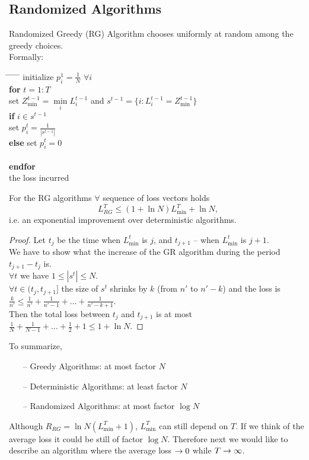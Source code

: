 \subsection{Randomized Algorithms}
\begin{definition}
Randomized Greedy (RG) Algorithm chooses uniformly at random among the greedy choices.\\
Formally:
\begin{tabbing}
\hspace*{.25in} \= \hspace*{.25in} \= \hspace*{.25in} \= \hspace*{.25in} \= \hspace*{.25in} \=\kill
\> initialize $p^1_i=\frac{1}{N}$ $\forall i$\\
\> {\bf for} $t=1:T$\\
\>\> set $Z^{t-1}_{\min}=\min\limits_{i}L^{t-1}_i$ and $s^{t-1}=\{i:L^{t-1}_i=Z^{t-1}_{\min}\}$\\
\>\> {\bf if} $i\in s^{t-1}$\\
\>\>\> set $p^t_i=\frac{1}{|s^{t-1}|}$\\
\>\> {\bf else} set $p^t_i=0$\\
\> \\
\> {\bf endfor}\\
 the loss incurred
\end{tabbing}
\end{definition}
\begin{theorem}
For the RG algorithms $\forall$ sequence of loss vectors holds
$$
L^T_{RG}\leq(1+\ln N)L^T_{\min}+\ln N,
$$
i.e. an exponential improvement over deterministic algorithms.
\end{theorem}
\begin{proof}
Let $t_j$ be the time when $L^t_{\min}$ is $j$, and $t_{j+1}$ -- when $L^t_{\min}$ is $j+1$.\\
We have to show what the increase of the GR algorithm during the period $t_{j+1}-t_j$ is.\\
$\forall t$ we have $1\leq|s^t|\leq N$.\\
$\forall t\in(t_{j},t_{j+1}]$ the size of $s^t$ shrinks by $k$ (from $n'$ to $n'-k$) and the loss is $\frac{k}{n'}\leq\frac{1}{n'}+\frac{1}{n'-1}+\ldots+\frac{1}{n'-k+1}$.\\
Then the total loss between $t_j$ and $t_{j+1}$ is at most $\frac{1}{N}+\frac{1}{N-1}+\ldots+\frac{1}{2}+1\leq 1+\ln N$.
\end{proof}
To summarize,
\begin{itemize}
\item[--] Greedy Algorithms: at most factor $N$
\item[--] Deterministic Algorithms: at least factor $N$
\item[--] Randomized Algorithms: at most factor $\log N$
\end{itemize}
Although $R_{RG}=\ln N(L^T_{\min}+1)$, $L^T_{\min}$ can still depend on $T$.
If we think of the average loss it could be still of factor $\log N$.
Therefore next we would like to describe an algorithm where the average loss $\rightarrow 0$ while $T\rightarrow\infty$.



